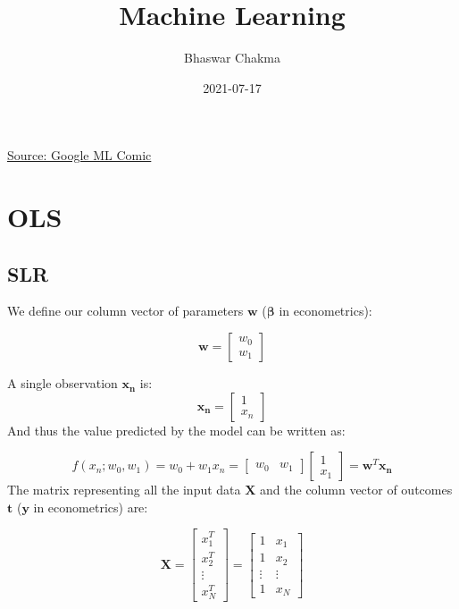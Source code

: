 \documentclass[
]{book}
\title{Machine Learning}
\author{Bhaswar Chakma}
\date{2021-07-17}
\begin{document}
\maketitle

{
\setcounter{tocdepth}{1}
\tableofcontents
}
\hypertarget{section}{%
\chapter*{}\label{section}}

\href{https://cloud.google.com/products/ai/ml-comic-1/}{Source: Google ML Comic}

\hypertarget{ols}{%
\chapter{OLS}\label{ols}}

\hypertarget{slr}{%
\section{SLR}\label{slr}}

We define our column vector of parameters \(\mathbf{w}\)
(\(\boldsymbol{\beta}\) in econometrics):

\[\mathbf{w} = \begin{bmatrix}
           w_{0} \\
           w_{1} 
         \end{bmatrix}\]

A single observation \(\mathbf{x_n}\) is: \[
  \mathbf{x_n} =
  \begin{bmatrix}
          1 \\
          x_{n} 
  \end{bmatrix}
\] And thus the value predicted by the model can be written as:

\[
  f(x_n; w_0, w_1) = 
  w_0 + w_1x_n = 
  \begin{bmatrix}
  w_0 & w_1
  \end{bmatrix}
  \begin{bmatrix}
  1 \\ x_1
  \end{bmatrix} = 
  \mathbf{w}^T\mathbf{x_n}
\] The matrix representing all the input data \(\mathbf{X}\) and the
column vector of outcomes \(\mathbf{t}\) (\(\mathbf{y}\) in econometrics)
are:

\[
\mathbf{X} = 
\begin{bmatrix}
x_{1}^T \\
x_{2}^T \\
\vdots \\
x_{N}^T
\end{bmatrix}
= \begin{bmatrix}
1 & x_{1} \\
1 & x_{2} \\
\vdots & \vdots\\
1 & x_{N}
\end{bmatrix}
\]
\end{document}
